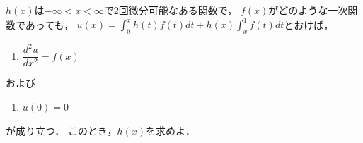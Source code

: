 \documentclass[../../main.tex]{subfiles}
\begin{document}
$h(x)$は$-\infty<x<\infty$で2回微分可能なある関数で，
$f(x)$がどのような一次関数であっても，
$\displaystyle u(x)=\int_0^x h(t)f(t)dt+h(x)\int_x^1 f(t)dt$とおけば，
\begin{enumerate}
  \item $\displaystyle\dfrac{d^2u}{dx^2}=f(x)$
\end{enumerate}
および
\begin{enumerate}
  \item $u(0)=0$
\end{enumerate}
が成り立つ．
このとき，$h(x)$を求めよ．
\end{document}
